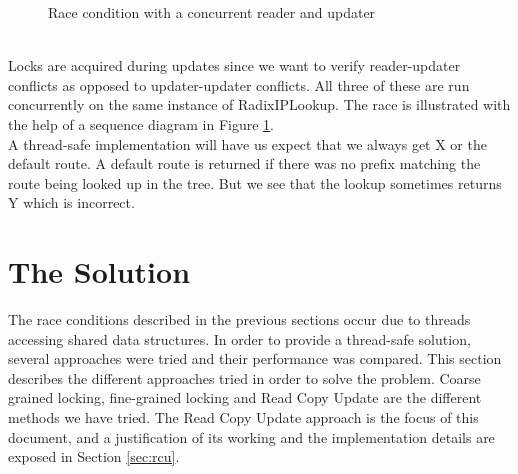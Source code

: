 \documentclass[a4paper,marginparwidth=50pt,marginparsep=10pt]{article}
\begin{document}
\begin{figure}[tph]
\caption{Race condition with a concurrent reader and updater}
\label{race_readerfigure}
\end{figure}
\\
Locks are acquired during updates since we want to verify reader-updater conflicts as opposed to updater-updater conflicts. All three of these are run concurrently on the same instance of RadixIPLookup. The race is illustrated with the help of a sequence diagram in Figure \ref{race_readerfigure}.\\

A thread-safe implementation will have us expect that we always get X or the default route. A default route is returned if there was no prefix matching the route being looked up in the tree. But we see that the lookup sometimes returns Y which is incorrect.
\section{The Solution}
\label{sec:solution}
The race conditions described in the previous sections occur due to threads accessing shared data structures. In order to provide a thread-safe solution, several approaches were tried and their performance was compared. This section describes the different approaches tried in order to solve the problem. Coarse grained locking, fine-grained locking and Read Copy Update are the different methods we have tried. The Read Copy Update approach is the focus of this document, and a justification of its working and the implementation details are exposed in Section \ref{sec:rcu}.
\end{document}

